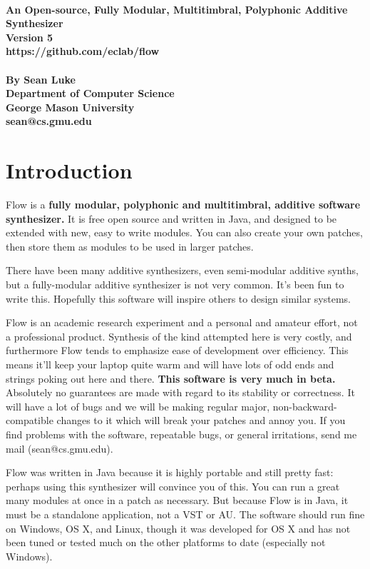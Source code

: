 \documentclass{article}
\newcommand\name{Flow}
\begin{document}
\noindent {\Huge\bf {\name}}\\[0.5em]
{\large \bf An Open-source, Fully Modular, Multitimbral, Polyphonic Additive Synthesizer\\[0.2em]
Version 5\\[0.2em]
https://github.com/eclab/flow\\\\[0.2em]
By Sean Luke\\[0.2em]
Department of Computer Science\\[0.25em]
George Mason University\\[0.2em]
sean@cs.gmu.edu}

\tableofcontents

\clearpage

\section{Introduction}

{\name} is a {\bf fully modular, polyphonic and multitimbral, additive software synthesizer.}  It is free open source and written in Java, and designed to be extended with new, easy to write modules.  You can also create your own patches, then store them as modules to be used in larger patches. 

There have been many additive synthesizers, even semi-modular additive synths, but a fully-modular additive synthesizer is not very common.   It's been fun to write this.  Hopefully this software will inspire others to design similar systems.

{\name} is an academic research experiment and a personal and amateur effort, not a professional product.  Synthesis of the kind attempted here is very costly, and furthermore {\name} tends to emphasize ease of development over efficiency.  This means it'll keep your laptop quite warm and will have lots of odd ends and strings poking out here and there.  {\bf This software is very much in beta.} Absolutely no guarantees are made with regard to its stability or correctness.  It will have a lot of bugs and we will be making regular major, non-backward-compatible changes to it which will break your patches and annoy you.  If you find problems with the software, repeatable bugs, or general irritations, send me mail (sean@cs.gmu.edu).

{\name} was written in Java because it is highly portable and still pretty fast: perhaps using this synthesizer will convince you of this.  You can run a great many modules at once in a patch as necessary.  But because {\name} is in Java, it must be a standalone application, not a VST or AU.  The software should run fine on Windows, OS X, and Linux, though it was developed for OS X and has not been tuned or tested much on the other platforms to date (especially not Windows).
\end{document}
